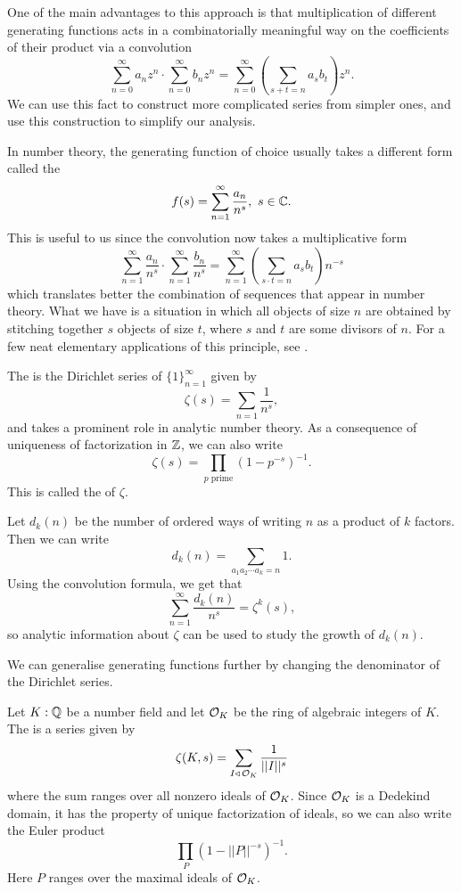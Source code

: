 \documentclass[12pt, a4paper]{amsart}
\begin{document}
One of the main advantages to
this approach is that multiplication of different generating functions acts in
a combinatorially meaningful way on the coefficients of their product via a
convolution
\[\sum\limits_{n=0}^\infty a_n z^n \cdot \sum_{n=0}^\infty b_n z^n =
\sum\limits_{n=0}^\infty \left( \sum\limits_{s+t = n} a_sb_t \right)z^n.\]
We can use this fact to construct more complicated series from
simpler ones, and use this construction to simplify our analysis.

In number theory, the generating function of choice usually takes a different
form called the 
\[f(s) = \sum\limits_{n=1}^\infty\frac{a_n}{n^s}, \,\, s \in {\mathbb C}. \]
This is useful to us since the convolution now takes a multiplicative form
\[\sum\limits_{n=1}^\infty\frac{a_n}{n^s} \cdot
  \sum\limits_{n=1}^\infty\frac{b_n}{n^s} =
  \sum\limits_{n=1}^\infty \left( \sum\limits_{s \cdot t = n} a_sb_t \right) n^{-s}\]
which translates better the combination of sequences that appear in number
theory. What we have is a situation in which all
objects of size $n$ are obtained by stitching together $s$ objects of size $t$,
where $s$ and $t$ are some divisors of $n$.
For a few neat elementary applications of this principle, see \cite[Section 2.6, pages 59-68]{wilf}.

\begin{example}
  The  is the Dirichlet series of
  $\{1\}_{n=1}^\infty$ given by
  \[\zeta(s) = \sum\limits_{n=1} \frac{1}{n^s},\]
  and takes a prominent role in analytic number theory.
  As a consequence of uniqueness of factorization in ${\mathbb Z}$, we can also write
  \[\zeta(s) = \prod\limits_{p \text{ prime}}\left( 1-p^{-s} \right)^{-1}.\]
  This is called the  of $\zeta.$
\end{example}

\begin{example}
  Let $d_k(n)$ be the number of ordered ways of writing $n$ as a product of $k$
  factors. Then we can write
  \[d_k(n) = \sum\limits_{a_1 a_2 \cdots a_k = n} 1.\]
  Using the convolution formula, we get that
  \[\sum\limits_{n=1}^\infty \frac{d_k(n)}{n^s} = \zeta^k(s),\]
  so analytic information about $\zeta$ can be used to study the growth of
  $d_k(n).$
\end{example}

We can generalise generating functions further by changing the denominator of
the Dirichlet series. 

\begin{example}
  Let $K : {\mathbb Q}$ be a number field and let ${\mathcal O}_K$ be the ring of algebraic
  integers of $K$.
  The  is
  a series given by 
  \[\zeta(K,s) = \sum\limits_{I \triangleleft \, {\mathcal O}_K} \frac{1}{||I||^s} \]
  where the sum ranges over all nonzero ideals of ${\mathcal O}_K$.
  Since ${\mathcal O}_K$ is a Dedekind domain, it has the property of unique
  factorization of ideals, so we can also write the Euler product
  \[\prod\limits_P \left( 1-||P||^{-s} \right)^{-1}.\]
  Here $P$ ranges over the maximal ideals of ${\mathcal O}_K$. 
\end{example}
\end{document}
